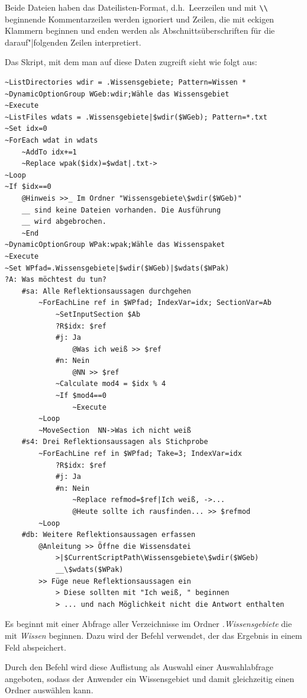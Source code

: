 Beide Dateien haben das Dateilisten-Format, d.h.\ Leerzeilen und mit \verb|\\| beginnende Kommentarzeilen werden ignoriert und Zeilen, die mit eckigen Klammern beginnen und enden werden als Abschnittsüberschriften für die darauf"|folgenden Zeilen interpretiert.

Das Skript, mit dem man auf diese Daten zugreift sieht wie folgt aus:

\label{BspWissensreflektion}
\begin{verbatim}
~ListDirectories wdir = .Wissensgebiete; Pattern=Wissen *
~DynamicOptionGroup WGeb:wdir;Wähle das Wissensgebiet
~Execute
~ListFiles wdats = .Wissensgebiete|$wdir($WGeb); Pattern=*.txt
~Set idx=0
~ForEach wdat in wdats
    ~AddTo idx+=1
    ~Replace wpak($idx)=$wdat|.txt->
~Loop
~If $idx==0
    @Hinweis >>_ Im Ordner "Wissensgebiete\$wdir($WGeb)"
    __ sind keine Dateien vorhanden. Die Ausführung
    __ wird abgebrochen.
    ~End
~DynamicOptionGroup WPak:wpak;Wähle das Wissenspaket
~Execute
~Set WPfad=.Wissensgebiete|$wdir($WGeb)|$wdats($WPak)
?A: Was möchtest du tun?
    #sa: Alle Reflektionsaussagen durchgehen
        ~ForEachLine ref in $WPfad; IndexVar=idx; SectionVar=Ab
            ~SetInputSection $Ab
            ?R$idx: $ref
            #j: Ja
                @Was ich weiß >> $ref
            #n: Nein
                @NN >> $ref
            ~Calculate mod4 = $idx % 4
            ~If $mod4==0
                ~Execute
        ~Loop
        ~MoveSection  NN->Was ich nicht weiß
    #s4: Drei Reflektionsaussagen als Stichprobe
        ~ForEachLine ref in $WPfad; Take=3; IndexVar=idx
            ?R$idx: $ref
            #j: Ja
            #n: Nein
                ~Replace refmod=$ref|Ich weiß, ->...
                @Heute sollte ich rausfinden... >> $refmod
        ~Loop
    #db: Weitere Reflektionsaussagen erfassen
        @Anleitung >> Öffne die Wissensdatei
            >|$CurrentScriptPath\Wissensgebiete\$wdir($WGeb)
            __\$wdats($WPak)
        >> Füge neue Reflektionsaussagen ein
            > Diese sollten mit "Ich weiß, " beginnen
            > ... und nach Möglichkeit nicht die Antwort enthalten
\end{verbatim}

Es beginnt mit einer Abfrage aller Verzeichnisse im Ordner \emph{.Wissensgebiete} die mit \emph{Wissen} beginnen. Dazu wird der Befehl  verwendet, der das Ergebnis in einem Feld abspeichert.

Durch den Befehl  wird diese Auf\-lis\-tung als Auswahl einer Auswahlabfrage angeboten, sodass der Anwender ein Wissensgebiet und damit gleichzeitig einen Ordner auswählen kann.

